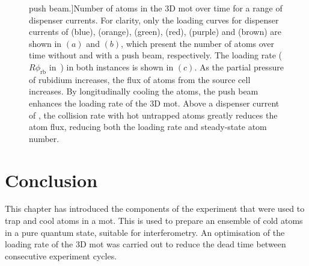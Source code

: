 \begin{figure}[!htbp]
		push beam.]{Number of atoms in the 3D \ac{mot} over time for a range of
		dispenser currents. For clarity, only the loading curves for dispenser
		currents of
		 (blue),
		(orange),  (green),  (red),
		 (purple) and  (brown) are
		shown in \((a)\) and \((b)\), which present the number of atoms over
		time without and with a push beam, respectively. The loading rate (\(R
		\phi_\text{rb}\) in~) in both instances is
		shown in \((c)\). As the partial pressure of rubidium increases, the
		flux of atoms from the source cell increases. By longitudinally cooling
		the atoms, the push beam enhances the loading rate of the 3D \ac{mot}.
		Above a dispenser current of
		, the collision rate with hot untrapped atoms greatly reduces the atom flux, reducing both the loading rate and steady-state atom number.}
	\label{fig:loading_plots}
\end{figure}

\section{Conclusion}
This chapter has introduced the components of the experiment that were used to
trap and cool atoms in a \ac{mot}. This is used to prepare an ensemble of cold
atoms in a pure quantum state, suitable for interferometry. An optimisation of
the loading rate of the 3D \ac{mot} was carried out to reduce the dead time
between consecutive experiment cycles. 
